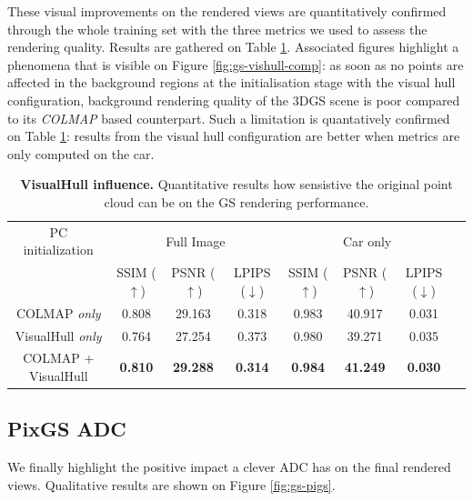 These visual improvements on the rendered views are quantitatively confirmed through the whole training set with the three metrics we used to assess the rendering quality. Results are gathered on Table \ref{table:gs-vh-influence}. Associated figures highlight a phenomena that is visible on Figure \ref{fig:gs-vishull-comp}: as soon as no points are affected in the background regions at the initialisation stage with the visual hull configuration, background rendering quality of the 3D\ac{GS} scene is poor compared to its  \textit{COLMAP} based counterpart. Such a limitation is quantatively confirmed on Table \ref{table:gs-vh-influence}: results from the visual hull configuration are better when metrics are only computed on the car. 
\begin{table}[htp!]
  \caption{\textbf{VisualHull influence.} Quantitative results how sensistive the original point cloud can be on the GS rendering performance.}
  \label{table:gs-vh-influence}
  \begin{adjustbox}{width=\linewidth}
  \begin{tabular}[h]{c||ccccccc}
  \hline
   PC initialization & \multicolumn{3}{c}{Full Image} & \multicolumn{3}{c}{Car only} \\
   &  SSIM ($\uparrow$) & PSNR ($\uparrow$) & LPIPS ($\downarrow$) & SSIM ($\uparrow$) & PSNR ($\uparrow$) & LPIPS ($\downarrow$)\\
  \hline
  COLMAP \textit{only} & 0.808 & 29.163 & 0.318 & 0.983 & 40.917 & 0.031\\
  VisualHull \textit{only} & 0.764 & 27.254 & 0.373 & 0.980 &   39.271 & 0.035 \\
  COLMAP + VisualHull & \textbf{0.810} & \textbf{29.288} & \textbf{0.314}  & \textbf{0.984} & \textbf{41.249}   & \textbf{0.030} \\
  \hline 
  \end{tabular}
  \end{adjustbox}
  \end{table}

\subsection{PixGS ADC} 

We finally highlight the positive impact a clever \ac{ADC} has on the final rendered views. Qualitative results are shown on Figure \ref{fig:gs-pigs}. 

